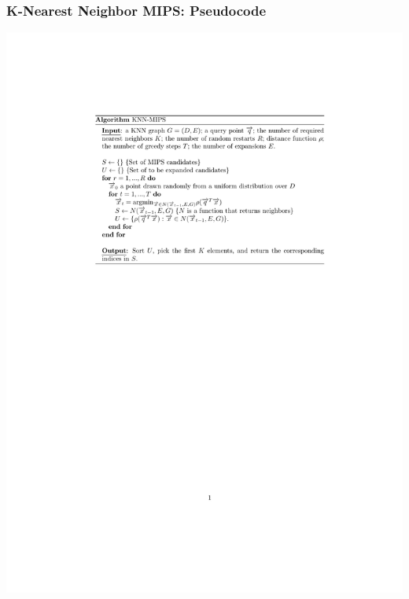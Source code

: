 \documentclass{beamer}
\begin{document}
\begin{frame}[fragile]
\frametitle{K-Nearest Neighbor MIPS: Pseudocode}

\begin{minipage}[c]{1.4\textwidth}
    \vspace{-2cm} %
    \hspace{-2.5cm}
    \includegraphics[width=\linewidth]{GNN/imgs/KNN-MIPS.pdf}
\end{minipage}

\end{frame}

\end{document}
